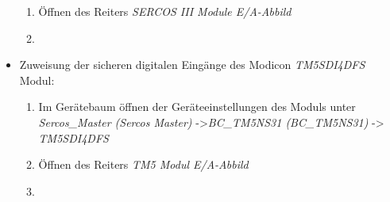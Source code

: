 \documentclass[../../../Bachelorarbeit.tex]{subfiles}
\begin{document}
\begin{itemize}
\begin{enumerate}
        \item \normalsize Öffnen des Reiters \textit{SERCOS III Module E/A-Abbild}
        \item \begin{minipage}[t]{\linewidth}
            \raggedright
            \label{fig:my-img27}
        \end{minipage}
    \end{enumerate}
    \item Zuweisung der sicheren digitalen Eingänge des Modicon \textit{TM5SDI4DFS} Modul:
    \begin{enumerate}
        \item Im Gerätebaum öffnen der Geräteeinstellungen des Moduls unter \textit{Sercos\_Master (Sercos Master)} ->\small \textit{BC\_TM5NS31 (BC\_TM5NS31)} -> \textit{TM5SDI4DFS}
        \item \normalsize Öffnen des Reiters \textit{TM5 Modul E/A-Abbild}
        \item \begin{minipage}[t]{\linewidth}
            \raggedright
\end{minipage}
\end{enumerate}
\end{itemize}
\end{document}
